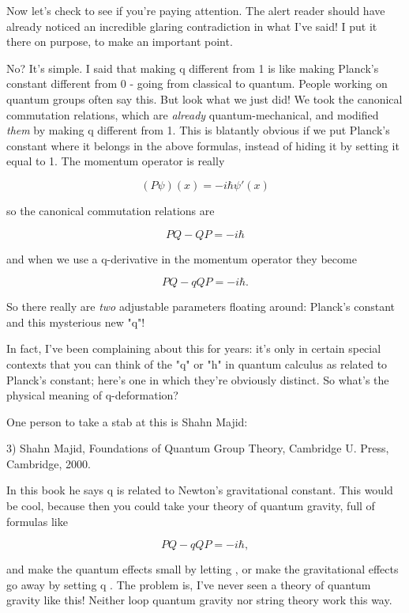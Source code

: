 Now let's check to see if you're paying attention.  The alert reader
should have already noticed an incredible glaring contradiction in what
I've said!  I put it there on purpose, to make an important point.

No?  It's simple.  I said that making q different from 1 is like making
Planck's constant different from 0 - going from classical to quantum. 
People working on quantum groups often say this.  But look what we just
did!  We took the canonical commutation relations, which are \emph{already}
quantum-mechanical, and modified \emph{them} by making q different from 1. 
This is blatantly obvious if we put Planck's constant where it belongs
in the above formulas, instead of hiding it by setting it equal to 1. 
The momentum operator is really


$$

(P \psi )(x) = -i \hbar  \psi '(x)
$$
    
so the canonical commutation relations are 


$$

PQ - QP = -i \hbar 
$$
    
and when we use a q-derivative in the momentum operator they become


$$

PQ - qQP = -i \hbar .
$$
    
So there really are \emph{two} adjustable parameters floating around:
Planck's constant and this mysterious new "q"!

In fact, I've been complaining about this for years: it's only in
certain special contexts that you can think of the "q" or
"h" in quantum calculus as related to Planck's constant;
here's one in which they're obviously distinct.  So what's the physical
meaning of q-deformation?

One person to take a stab at this is Shahn Majid:

3) Shahn Majid, Foundations of Quantum Group Theory, Cambridge U.
Press, Cambridge, 2000.

In this book he says q is related to Newton's gravitational constant.
This would be cool, because then you could take your theory of quantum 
gravity, full of formulas like


$$

PQ - qQP = -i \hbar ,
$$
    
and make the quantum effects small by letting \hbar  {}, or make the
gravitational effects go away by setting q .  The problem is, I've
never seen a theory of quantum gravity like this!  Neither loop quantum
gravity nor string theory work this way.  

